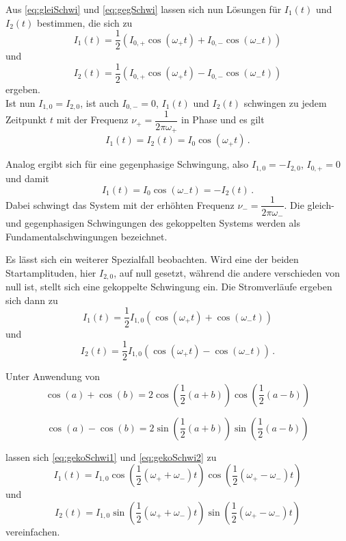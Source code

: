 Aus \eqref{eq:gleiSchwi} und \eqref{eq:gegSchwi} lassen sich nun Lösungen für $I_1(t)$ und $I_2(t)$ bestimmen, die sich zu
\begin{equation}
    I_1(t) = \dfrac{1}{2}(I_{0,+}\cos(ω_+ t) + I_{0,-}\cos(ω_- t))
\end{equation}
und
\begin{equation}
    I_2(t) = \dfrac{1}{2}(I_{0,+}\cos(ω_+ t) - I_{0,-}\cos(ω_- t))
\end{equation}
ergeben. \\

Ist nun $I_{1,0} = I_{2,0}$, ist auch $I_{0,-} = 0$, $I_1(t)$ und $I_2(t)$ schwingen zu jedem Zeitpunkt $t$ mit der Frequenz $ν_+ = \dfrac{1}{2πω_+}$ in Phase und es gilt
\begin{equation*}
     I_1(t) = I_2(t) = I_0 \cos(ω_+ t)\,.
\end{equation*}

Analog ergibt sich für eine gegenphasige Schwingung, also $I_{1,0} = -I_{2,0}$, $I_{0,+}=0$ und damit
\begin{equation*}
    I_1(t) = I_0 \cos(ω_- t) = -I_2(t)\,.
\end{equation*}
Dabei schwingt das System mit der erhöhten Frequenz $ν_- = \dfrac{1}{2πω_-}$. Die gleich- und gegenphasigen Schwingungen des gekoppelten Systems werden als Fundamentalschwingungen bezeichnet.

Es lässt sich ein weiterer Spezialfall beobachten. Wird eine der beiden Startamplituden, hier $I_{2,0}$, auf null gesetzt, während die andere verschieden von null ist, stellt sich eine gekoppelte Schwingung ein.
Die Stromverläufe ergeben sich dann zu
\begin{equation}
    I_1(t) = \dfrac{1}{2} I_{1,0}(\cos(ω_+ t) + \cos(ω_- t))
    \label{eq:gekoSchwi1}
\end{equation}
und
\begin{equation}
    I_2(t) = \dfrac{1}{2} I_{1,0}(\cos(ω_+ t) - \cos(ω_- t))\,.
    \label{eq:gekoSchwi2}
\end{equation}

Unter Anwendung von
\begin{equation*}
    \cos(a) + \cos(b) = 2 \cos(\dfrac{1}{2}(a+b)) \cos(\dfrac{1}{2}(a-b))
\end{equation*} 

\begin{equation*}
    \cos(a) - \cos(b) = 2 \sin(\dfrac{1}{2}(a+b)) \sin(\dfrac{1}{2}(a-b))
\end{equation*} 

lassen sich \eqref{eq:gekoSchwi1} und \eqref{eq:gekoSchwi2} zu
\begin{equation*}
    I_1(t) = I_{1,0}\cos(\dfrac{1}{2}(ω_+ + ω_-)t) \cos(\dfrac{1}{2}(ω_+ - ω_-)t) 
\end{equation*}
und
\begin{equation*}
    I_2(t) = I_{1,0}\sin(\dfrac{1}{2}(ω_+ + ω_-)t) \sin(\dfrac{1}{2}(ω_+ - ω_-)t)
\end{equation*}
vereinfachen.
